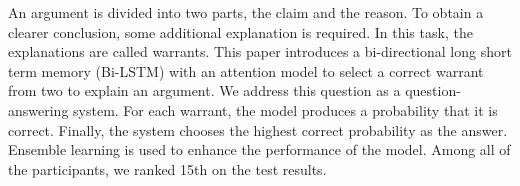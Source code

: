 An argument is divided into two parts, the claim and the reason. To obtain a clearer conclusion, some additional explanation is required. In this task, the explanations are called warrants. This paper introduces a bi-directional long short term memory (Bi-LSTM) with an attention model to select a correct warrant from two to explain an argument. We address this question as a question-answering system. For each warrant, the model produces a probability that it is correct. Finally, the system chooses the highest correct probability as the answer. Ensemble learning is used to enhance the performance of the model. Among all of the participants, we ranked 15th on the test results.
